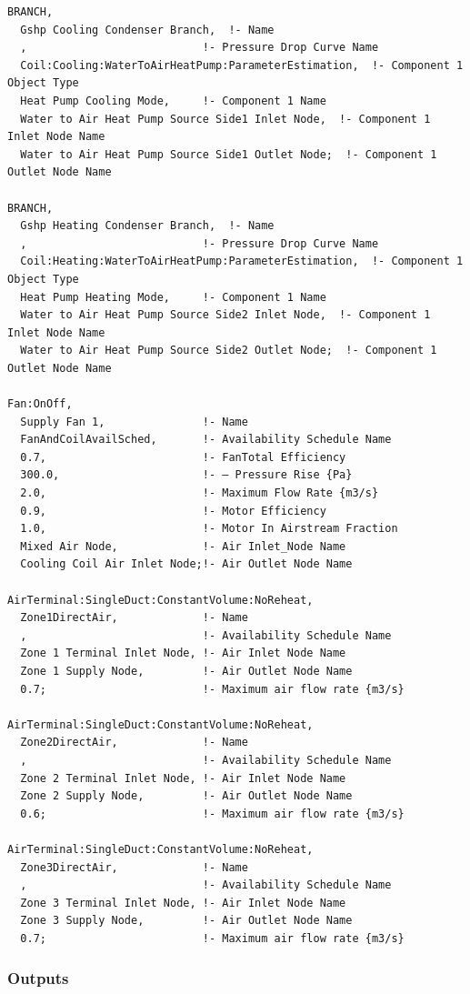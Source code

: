 \begin{lstlisting}
BRANCH,
  Gshp Cooling Condenser Branch,  !- Name
  ,                           !- Pressure Drop Curve Name
  Coil:Cooling:WaterToAirHeatPump:ParameterEstimation,  !- Component 1 Object Type
  Heat Pump Cooling Mode,     !- Component 1 Name
  Water to Air Heat Pump Source Side1 Inlet Node,  !- Component 1 Inlet Node Name
  Water to Air Heat Pump Source Side1 Outlet Node;  !- Component 1 Outlet Node Name

BRANCH,
  Gshp Heating Condenser Branch,  !- Name
  ,                           !- Pressure Drop Curve Name
  Coil:Heating:WaterToAirHeatPump:ParameterEstimation,  !- Component 1 Object Type
  Heat Pump Heating Mode,     !- Component 1 Name
  Water to Air Heat Pump Source Side2 Inlet Node,  !- Component 1 Inlet Node Name
  Water to Air Heat Pump Source Side2 Outlet Node;  !- Component 1 Outlet Node Name

Fan:OnOff,
  Supply Fan 1,               !- Name
  FanAndCoilAvailSched,       !- Availability Schedule Name
  0.7,                        !- FanTotal Efficiency
  300.0,                      !- – Pressure Rise {Pa}
  2.0,                        !- Maximum Flow Rate {m3/s}
  0.9,                        !- Motor Efficiency
  1.0,                        !- Motor In Airstream Fraction
  Mixed Air Node,             !- Air Inlet_Node Name
  Cooling Coil Air Inlet Node;!- Air Outlet Node Name

AirTerminal:SingleDuct:ConstantVolume:NoReheat,
  Zone1DirectAir,             !- Name
  ,                           !- Availability Schedule Name
  Zone 1 Terminal Inlet Node, !- Air Inlet Node Name
  Zone 1 Supply Node,         !- Air Outlet Node Name
  0.7;                        !- Maximum air flow rate {m3/s}

AirTerminal:SingleDuct:ConstantVolume:NoReheat,
  Zone2DirectAir,             !- Name
  ,                           !- Availability Schedule Name
  Zone 2 Terminal Inlet Node, !- Air Inlet Node Name
  Zone 2 Supply Node,         !- Air Outlet Node Name
  0.6;                        !- Maximum air flow rate {m3/s}

AirTerminal:SingleDuct:ConstantVolume:NoReheat,
  Zone3DirectAir,             !- Name
  ,                           !- Availability Schedule Name
  Zone 3 Terminal Inlet Node, !- Air Inlet Node Name
  Zone 3 Supply Node,         !- Air Outlet Node Name
  0.7;                        !- Maximum air flow rate {m3/s}
\end{lstlisting}

\subsubsection{Outputs}\label{outputs-6-011}

